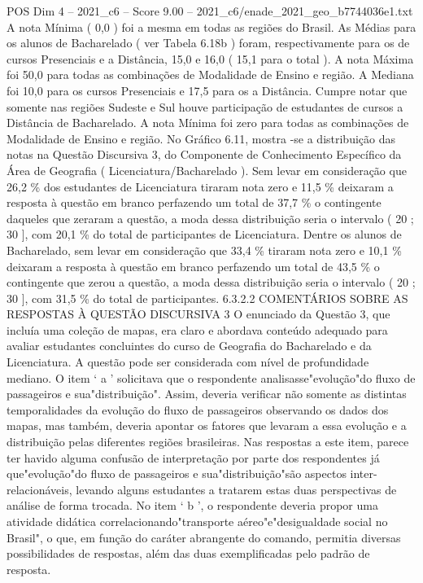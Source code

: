 \begin{textsample}{POS Dim 4 – 2021\_c6 – Score 9.00 – 2021\_c6/enade\_2021\_geo\_b7744036e1.txt}
A nota Mínima ( 0,0 ) foi a mesma em todas as regiões do Brasil.
As Médias para os alunos de Bacharelado ( ver Tabela 6.18b ) foram, respectivamente para os de cursos Presenciais e a Distância, 15,0 e 16,0 ( 15,1 para o total ).
A nota Máxima foi 50,0 para todas as combinações de Modalidade de Ensino e região.
A Mediana foi 10,0 para os cursos Presenciais e 17,5 para os a Distância.
Cumpre notar que somente nas regiões Sudeste e Sul houve participação de estudantes de cursos a Distância de Bacharelado.
A nota Mínima foi zero para todas as combinações de Modalidade de Ensino e região.
No Gráfico 6.11, mostra -se a distribuição das notas na Questão Discursiva 3, do Componente de Conhecimento Específico da Área de Geografia ( Licenciatura/Bacharelado ).
Sem levar em consideração que 26,2 \% dos estudantes de Licenciatura tiraram nota zero e 11,5 \% deixaram a resposta à questão em branco perfazendo um total de 37,7 \% o contingente daqueles que zeraram a questão, a moda dessa distribuição seria o intervalo ( 20 ; 30 ], com 20,1 \% do total de participantes de Licenciatura.
Dentre os alunos de Bacharelado, sem levar em consideração que 33,4 \% tiraram nota zero e 10,1 \% deixaram a resposta à questão em branco perfazendo um total de 43,5 \% o contingente que zerou a questão, a moda dessa distribuição seria o intervalo ( 20 ; 30 ], com 31,5 \% do total de participantes. 6.3.2.2 COMENTÁRIOS SOBRE AS RESPOSTAS À QUESTÃO DISCURSIVA 3 O enunciado da Questão 3, que incluía uma coleção de mapas, era claro e abordava conteúdo adequado para avaliar estudantes concluintes do curso de Geografia do Bacharelado e da Licenciatura.
A questão pode ser considerada com nível de profundidade mediano.
O item ‘ a ’ solicitava que o respondente analisasse"evolução"do fluxo de passageiros e sua"distribuição".
Assim, deveria verificar não somente as distintas temporalidades da evolução do fluxo de passageiros observando os dados dos mapas, mas também, deveria apontar os fatores que levaram a essa evolução e a distribuição pelas diferentes regiões brasileiras.
Nas respostas a este item, parece ter havido alguma confusão de interpretação por parte dos respondentes já que"evolução"do fluxo de passageiros e sua"distribuição"são aspectos inter-relacionáveis, levando alguns estudantes a tratarem estas duas perspectivas de análise de forma trocada.
No item ‘ b ’, o respondente deveria propor uma atividade didática correlacionando"transporte aéreo"e"desigualdade social no Brasil", o que, em função do caráter abrangente do comando, permitia diversas possibilidades de respostas, além das duas exemplificadas pelo padrão de resposta.

\end{textsample}
